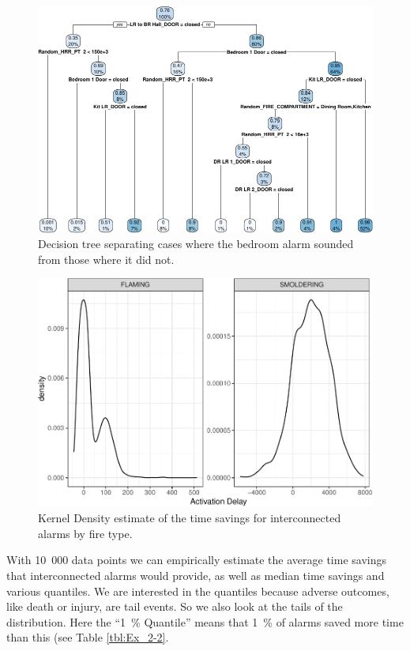 \documentclass[12pt,twoside]{book}
\begin{document}
\begin{figure}[h!]
\centering
\includegraphics[width=4.5in]{FIGURES/cart-1.pdf}
\caption{Decision tree separating cases where the bedroom alarm sounded from those where it did not.}
\label{Ex_2-decision_tree}
\end{figure}
\begin{figure}[h!]
\centering
\includegraphics[width=4.5in]{FIGURES/kde-1.pdf}
\caption{Kernel Density estimate of the time savings for interconnected alarms by fire type.}
\label{Ex_2-distributions}
\end{figure}

With 10~000 data points we can empirically estimate the average time savings that interconnected alarms would provide, as well as median time savings and various quantiles. We are interested in the quantiles because adverse outcomes, like death or injury, are tail events. So we also look at the tails of the distribution. Here the ``1~\% Quantile'' means that 1~\% of alarms saved more time than this (see Table \ref{tbl:Ex_2-2}.
\end{document}
